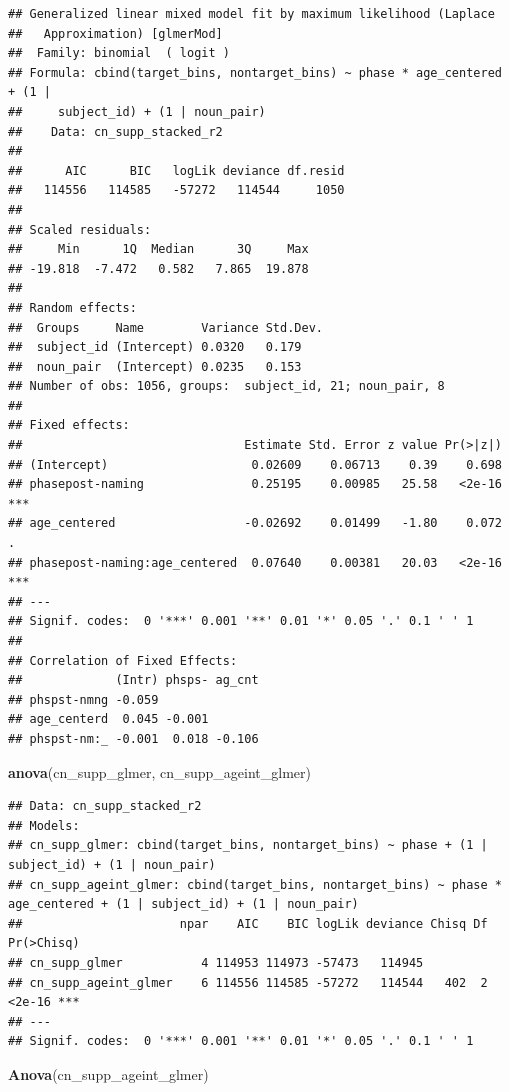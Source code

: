 \documentclass[
  doc,floatsintext]{apa6}
\newenvironment{Shaded}{\begin{snugshade}}{\end{snugshade}}
\newcommand{\FunctionTok}[1]{\textcolor[rgb]{0.13,0.29,0.53}{\textbf{#1}}}
\newcommand{\NormalTok}[1]{#1}
\begin{document}
\begin{verbatim}
## Generalized linear mixed model fit by maximum likelihood (Laplace
##   Approximation) [glmerMod]
##  Family: binomial  ( logit )
## Formula: cbind(target_bins, nontarget_bins) ~ phase * age_centered + (1 |  
##     subject_id) + (1 | noun_pair)
##    Data: cn_supp_stacked_r2
## 
##      AIC      BIC   logLik deviance df.resid 
##   114556   114585   -57272   114544     1050 
## 
## Scaled residuals: 
##     Min      1Q  Median      3Q     Max 
## -19.818  -7.472   0.582   7.865  19.878 
## 
## Random effects:
##  Groups     Name        Variance Std.Dev.
##  subject_id (Intercept) 0.0320   0.179   
##  noun_pair  (Intercept) 0.0235   0.153   
## Number of obs: 1056, groups:  subject_id, 21; noun_pair, 8
## 
## Fixed effects:
##                               Estimate Std. Error z value Pr(>|z|)    
## (Intercept)                    0.02609    0.06713    0.39    0.698    
## phasepost-naming               0.25195    0.00985   25.58   <2e-16 ***
## age_centered                  -0.02692    0.01499   -1.80    0.072 .  
## phasepost-naming:age_centered  0.07640    0.00381   20.03   <2e-16 ***
## ---
## Signif. codes:  0 '***' 0.001 '**' 0.01 '*' 0.05 '.' 0.1 ' ' 1
## 
## Correlation of Fixed Effects:
##             (Intr) phsps- ag_cnt
## phspst-nmng -0.059              
## age_centerd  0.045 -0.001       
## phspst-nm:_ -0.001  0.018 -0.106
\end{verbatim}

\begin{Shaded}
\begin{Highlighting}[]
\FunctionTok{anova}\NormalTok{(cn\_supp\_glmer, cn\_supp\_ageint\_glmer)}
\end{Highlighting}
\end{Shaded}

\begin{verbatim}
## Data: cn_supp_stacked_r2
## Models:
## cn_supp_glmer: cbind(target_bins, nontarget_bins) ~ phase + (1 | subject_id) + (1 | noun_pair)
## cn_supp_ageint_glmer: cbind(target_bins, nontarget_bins) ~ phase * age_centered + (1 | subject_id) + (1 | noun_pair)
##                      npar    AIC    BIC logLik deviance Chisq Df Pr(>Chisq)    
## cn_supp_glmer           4 114953 114973 -57473   114945                        
## cn_supp_ageint_glmer    6 114556 114585 -57272   114544   402  2     <2e-16 ***
## ---
## Signif. codes:  0 '***' 0.001 '**' 0.01 '*' 0.05 '.' 0.1 ' ' 1
\end{verbatim}

\begin{Shaded}
\begin{Highlighting}[]
\FunctionTok{Anova}\NormalTok{(cn\_supp\_ageint\_glmer)}
\end{Highlighting}
\end{Shaded}
\end{document}
